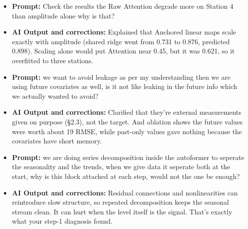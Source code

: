 \documentclass[11pt,a4paper]{article}
\begin{document}
\begin{itemize}
    \item \textbf{Prompt:} Check the results the Raw Attention degrade more on Station 4 than amplitude alone why is that?
    
    \item \textbf{AI Output and corrections:} Explained that Anchored linear maps scale exactly with amplitude (shared ridge went from 0.731 to 0.876, predicted 0.898). Scaling alone would put Attention near 0.45, but it was 0.621, so it overfitted to three stations.
\end{itemize}


\begin{itemize}
\item \textbf{Prompt:} we want to avoid leakage as per my understanding then we are using future covariates as well, is it not like leaking in the future info which we actually wanted to avoid?  
\item \textbf{AI Output and corrections:} Clarified that they're external measurements given on purpose (§2.3), not the target. And ablation shows the future values were worth about 19 RMSE, while past-only values gave nothing because the covariates have short memory. 
\end{itemize}

\begin{itemize}
\item \textbf{Prompt:} we are doing series decomposition inside the autoformer to seperate the seasonality and the trends, when we give data it seperate both at the start, why is this block attached at each step, would not the one be enough? 
\item \textbf{AI Output and corrections:} Residual connections and nonlinearities can reintroduce slow structure, so repeated decomposition keeps the seasonal stream clean. It can hurt when the level itself is the signal. That's exactly what your step-1 diagnosis found.
\end{itemize}
\end{document}

